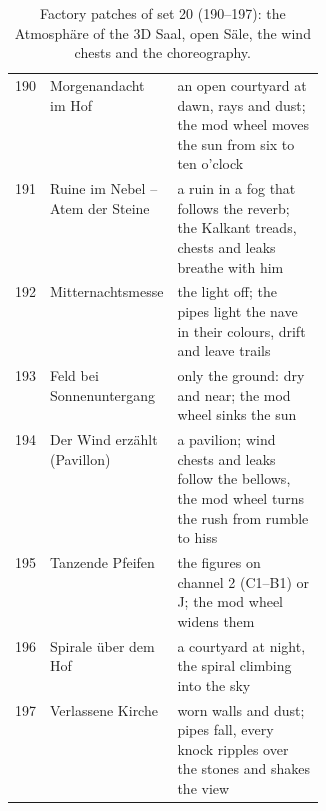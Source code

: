 \documentclass[11pt,a4paper,parskip=half,DIV=11,toc=bibliography]{scrartcl}
\begin{document}
\begin{table}[ht]
\centering\footnotesize
\begin{tabularx}{\linewidth}{@{}r>{\raggedright\arraybackslash}p{0.36\linewidth}>{\raggedright\arraybackslash}X@{}}
\toprule
190 & Morgenandacht im Hof & an open courtyard at dawn, rays and dust; the mod wheel moves the sun from six to ten o'clock \\
191 & Ruine im Nebel – Atem der Steine & a ruin in a fog that follows the reverb; the Kalkant treads, chests and leaks breathe with him \\
192 & Mitternachtsmesse & the light off; the pipes light the nave in their colours, drift and leave trails \\
193 & Feld bei Sonnenuntergang & only the ground: dry and near; the mod wheel sinks the sun \\
194 & Der Wind erzählt (Pavillon) & a pavilion; wind chests and leaks follow the bellows, the mod wheel turns the rush from rumble to hiss \\
195 & Tanzende Pfeifen & the figures on channel 2 (C1--B1) or J; the mod wheel widens them \\
196 & Spirale über dem Hof & a courtyard at night, the spiral climbing into the sky \\
197 & Verlassene Kirche & worn walls and dust; pipes fall, every knock ripples over the stones and shakes the view \\
\bottomrule
\end{tabularx}
\caption{Factory patches of set 20 (190--197): the Atmosphäre of the 3D Saal, open Säle, the wind chests and the choreography.}
\label{tab:patches6}
\end{table}
\end{document}
